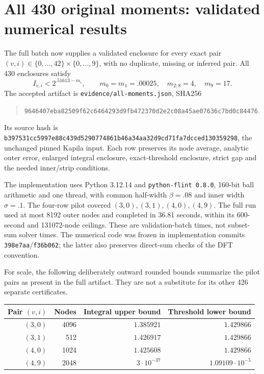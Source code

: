 \section{All 430 original moments: validated numerical results}\label{sec:validated-results}
The full batch now supplies a validated enclosure for every exact pair
$(v,i)\in\{0,\ldots,42\}\times\{0,\ldots,9\}$, with no duplicate,
missing or inferred pair. All 430 enclosures satisfy
\begin{equation}\label{eq:validated-old-moments}
 I_{v,i}<2^{.51613-m_i},\qquad
 m_0=m_1=.00025,\quad m_{2:8}=4,\quad m_9=17.
\end{equation}
The accepted artifact is \texttt{evidence/all-moments.json}, SHA256
\begin{quote}\small
\nolinkurl{9646407eba82509f62c6464293d9fb472370d2e2c08a45ae07636c7bd0c84476}.
\end{quote}
Its source hash is
\nolinkurl{b397531cc5997e88c439d5290774861b46a34aa32d9cd71fa7dcced130359298},
the unchanged pinned Kapila input. Each row preserves its node average,
analytic outer error, enlarged integral enclosure, exact-threshold
enclosure, strict gap and the needed inner/strip conditions.

The implementation uses Python 3.12.14 and \texttt{python-flint 0.8.0},
160-bit ball arithmetic and one thread, with common half-width
$\beta=.08$ and inner width $\sigma=.1$.
The four-row pilot covered $(3,0),(3,1),(4,0),(4,9)$. The full run
used at most 8192 outer nodes and completed in 36.81 seconds, within
its 600-second and 131072-node ceilings. These are validation-batch
times, not subset-sum solver times. The numerical code was frozen in
implementation commits \texttt{398e7aa}/\texttt{f36b062}; the latter
also preserves direct-sum checks of the DFT convention.

For scale, the following deliberately outward rounded bounds summarize
the pilot pairs as present in the full artifact. They are not a
substitute for its other 426 separate certificates.
\begin{center}\small
\begin{tabular}{rrrr}\toprule
Pair $(v,i)$ & Nodes & Integral upper bound & Threshold lower bound\\\midrule
$(3,0)$ & 4096 & $1.385921$ & $1.429866$\\
$(3,1)$ & 512 & $1.426917$ & $1.429866$\\
$(4,0)$ & 1024 & $1.425608$ & $1.429866$\\
$(4,9)$ & 2048 & $3\cdot10^{-37}$ & $1.09109\cdot10^{-5}$\\\bottomrule
\end{tabular}
\end{center}

